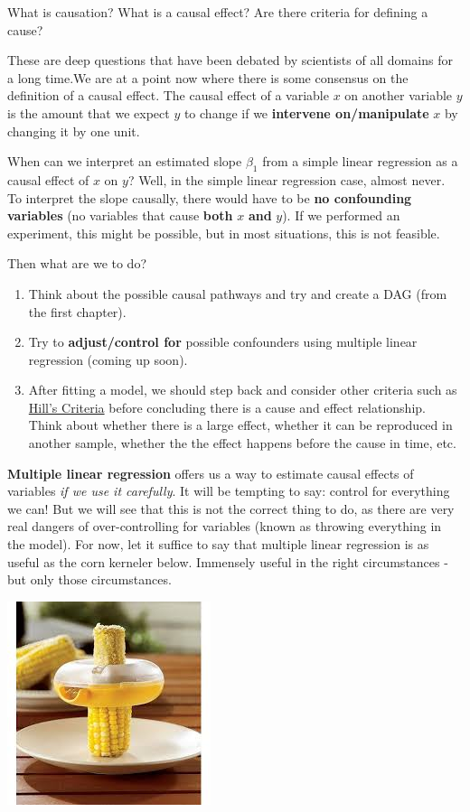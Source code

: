\documentclass[]{book}
\providecommand{\tightlist}{%
  \setlength{\itemsep}{0pt}\setlength{\parskip}{0pt}}
\begin{document}
What is causation? What is a causal effect? Are there criteria for defining a cause?

These are deep questions that have been debated by scientists of all domains for a long time.We are at a point now where there is some consensus on the definition of a causal effect. The causal effect of a variable \(x\) on another variable \(y\) is the amount that we expect \(y\) to change if we \textbf{intervene on/manipulate} \(x\) by changing it by one unit.

When can we interpret an estimated slope \(\beta_1\) from a simple linear regression as a causal effect of \(x\) on \(y\)? Well, in the simple linear regression case, almost never. To interpret the slope causally, there would have to be \textbf{no confounding variables} (no variables that cause \textbf{both} \(x\) \textbf{and} \(y\)). If we performed an experiment, this might be possible, but in most situations, this is not feasible.

Then what are we to do?

\begin{enumerate}
\def\labelenumi{\arabic{enumi}.}
\tightlist
\item
  Think about the possible causal pathways and try and create a DAG (from the first chapter).
\item
  Try to \textbf{adjust/control for} possible confounders using multiple linear regression (coming up soon).
\item
  After fitting a model, we should step back and consider other criteria such as \href{https://en.wikipedia.org/wiki/Bradford_Hill_criteria}{Hill's Criteria} before concluding there is a cause and effect relationship. Think about whether there is a large effect, whether it can be reproduced in another sample, whether the the effect happens before the cause in time, etc.
\end{enumerate}

\textbf{Multiple linear regression} offers us a way to estimate causal effects of variables \emph{if we use it carefully}. It will be tempting to say: control for everything we can! But we will see that this is not the correct thing to do, as there are very real dangers of over-controlling for variables (known as throwing everything in the model). For now, let it suffice to say that multiple linear regression is as useful as the corn kerneler below. Immensely useful in the right circumstances - but only those circumstances.

\includegraphics{Photos/corn.jpeg}
\end{document}
